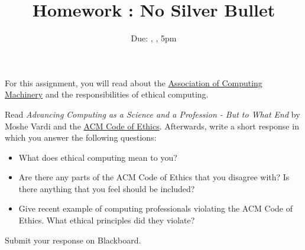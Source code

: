 \documentclass[12pt]{article}
\title{Homework \hwno: No Silver Bullet}
\date{Due: \dayofweekname{\duedate}{\duemonth}{\year}, \monthname[\duemonth] \duedate, 5pm}
\begin{document}
\maketitle

For this assignment, you will read about the \href{https://en.wikipedia.org/wiki/Association_for_Computing_Machinery}{Association of Computing Machinery} and the responsibilities of ethical computing.

Read \emph{Advancing Computing as a Science and a Profession - But to What End} by Moshe Vardi and the \href{https://www.acm.org/code-of-ethics}{ACM Code of Ethics}.
Afterwards, write a short response in which you answer the following questions:

\begin{itemize}
	\item What does ethical computing mean to you?
	\item Are there any parts of the ACM Code of Ethics that you disagree with?  Is there anything that you feel should be included?
	\item Give recent example of computing professionals violating the ACM Code of Ethics.  What ethical principles did they violate?
\end{itemize}

Submit your response on Blackboard.
\end{document}
